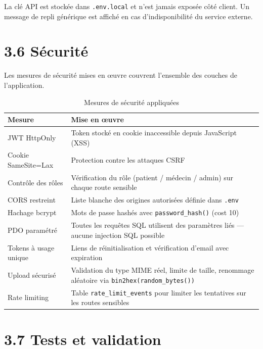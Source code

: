 \documentclass[12pt,a4paper]{report}
\begin{document}
La cl\'e API est stock\'ee dans \texttt{.env.local} et n'est jamais expos\'ee c\^ot\'e client. Un message de repli g\'en\'erique est affich\'e en cas d'indisponibilit\'e du service externe.

\section*{3.6 S\'ecurit\'e}

Les mesures de s\'ecurit\'e mises en \oe{}uvre couvrent l'ensemble des couches de l'application.

\begin{table}[H]
\centering
\renewcommand{\arraystretch}{1.4}
\caption{Mesures de s\'ecurit\'e appliqu\'ees}
\begin{tabularx}{\textwidth}{|l|X|}
\hline
\textbf{Mesure} & \textbf{Mise en \oe{}uvre} \\
\hline
JWT HttpOnly           & Token stock\'e en cookie inaccessible depuis JavaScript (XSS) \\
\hline
Cookie SameSite=Lax    & Protection contre les attaques CSRF \\
\hline
Contr\^ole des r\^oles & V\'erification du r\^ole (patient / m\'edecin / admin) sur chaque route sensible \\
\hline
CORS restreint         & Liste blanche des origines autoris\'ees d\'efinie dans \texttt{.env} \\
\hline
Hachage bcrypt         & Mots de passe hash\'es avec \texttt{password\_hash()} (cost 10) \\
\hline
PDO param\'etr\'e      & Toutes les requ\^etes SQL utilisent des param\`etres li\'es --- aucune injection SQL possible \\
\hline
Tokens \`a usage unique & Liens de r\'einitialisation et v\'erification d'email avec expiration \\
\hline
Upload s\'ecuris\'e    & Validation du type MIME r\'eel, limite de taille, renommage al\'eatoire via \texttt{bin2hex(random\_bytes())} \\
\hline
Rate limiting          & Table \texttt{rate\_limit\_events} pour limiter les tentatives sur les routes sensibles \\
\hline
\end{tabularx}
\end{table}

\section*{3.7 Tests et validation}
\end{document}
